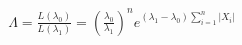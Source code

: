 \documentclass[preview]{standalone}
\begin{document}
\begin{align*}
\Lambda = \frac{L(\lambda_0)}{L(\lambda_1)} = \left(\frac{\lambda_0}{\lambda_1}\right)^n e^{(\lambda_1-\lambda_0)\sum_{i=1}^n |X_i|}
\end{align*}
\end{document}
